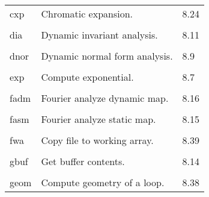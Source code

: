 \begin{center}
\begin{tabular}{lll}
\hspace{1.5em}cxp  & Chromatic expansion. & \hspace{2em}8.24\\
\vspace{-3mm}& &\\
\hspace{1.5em}dia     &           Dynamic invariant analysis.    &  \hspace{2em}8.11\\
\vspace{-3mm}& &\\
\hspace{1.5em}dnor    &           Dynamic normal form analysis.  &  \hspace{2em}8.9\\
\vspace{-3mm}& &\\
\hspace{1.5em}exp     &           Compute exponential.           &  \hspace{2em}8.7\\
\vspace{-3mm}& &\\
\hspace{1.5em}fadm    &           Fourier analyze dynamic map.   &  \hspace{2em}8.16\\
\vspace{-3mm}& &\\
\hspace{1.5em}fasm    &           Fourier analyze static map.    &  \hspace{2em}8.15\\
\vspace{-3mm}& &\\
\hspace{1.5em}fwa     &           Copy file to working array.    &  \hspace{2em}8.39\\
\vspace{-3mm}& &\\
\hspace{1.5em}gbuf    &           Get buffer contents.           &  \hspace{2em}8.14\\
\vspace{-3mm}& &\\
\hspace{1.5em}geom    &           Compute geometry of a loop.    &  \hspace{2em}8.38\\

\end{tabular}
\end{center}
